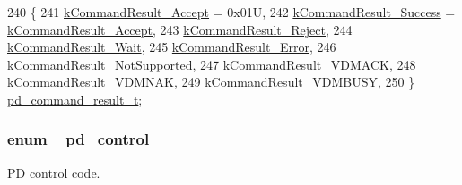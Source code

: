 \begin{DoxyCode}
240 \{
241     \hyperlink{group__usb__pd__stack_ggaa0c9fbfbfb4442ef9d805438bfeb045ca5cbc28129fbc8ef711e9af7a9400d858}{kCommandResult\_Accept} = 0x01U,                  
242     \hyperlink{group__usb__pd__stack_ggaa0c9fbfbfb4442ef9d805438bfeb045ca41691f050dc39a33f802354eacc3df48}{kCommandResult\_Success} = \hyperlink{group__usb__pd__stack_ggaa0c9fbfbfb4442ef9d805438bfeb045ca5cbc28129fbc8ef711e9af7a9400d858}{kCommandResult\_Accept}, 
243     \hyperlink{group__usb__pd__stack_ggaa0c9fbfbfb4442ef9d805438bfeb045ca1f47bf73466bcfd41a0e492b4ee77221}{kCommandResult\_Reject},                          
244     \hyperlink{group__usb__pd__stack_ggaa0c9fbfbfb4442ef9d805438bfeb045cabbcc951c401dbb830050a5ece204079a}{kCommandResult\_Wait},                            
245     \hyperlink{group__usb__pd__stack_ggaa0c9fbfbfb4442ef9d805438bfeb045ca2037b8a85f98d8d2413d589dbe7ea4fd}{kCommandResult\_Error},                           
246     \hyperlink{group__usb__pd__stack_ggaa0c9fbfbfb4442ef9d805438bfeb045caa7d52b6983bc63b06da53587776a1664}{kCommandResult\_NotSupported},                    
247     \hyperlink{group__usb__pd__stack_ggaa0c9fbfbfb4442ef9d805438bfeb045ca8de7fa85a3e37afed0b95cd975959f13}{kCommandResult\_VDMACK},                          
248     \hyperlink{group__usb__pd__stack_ggaa0c9fbfbfb4442ef9d805438bfeb045cac783d71949646db3d0780d123de6bf3c}{kCommandResult\_VDMNAK},                          
249     \hyperlink{group__usb__pd__stack_ggaa0c9fbfbfb4442ef9d805438bfeb045ca7d97a0d078d217c54b88f5a076204572}{kCommandResult\_VDMBUSY},                         
250 \} \hyperlink{group__usb__pd__stack_ga59917b1485caba4dd8d9b65ca5a5fd92}{pd\_command\_result\_t};
\end{DoxyCode}
\hypertarget{group__usb__pd__stack_ga0edd2a390d28d96646bc71aac1858af1}{
\subsubsection[{\-\_\-pd\-\_\-control}]{\setlength{\rightskip}{0pt plus 5cm}enum {\bf \-\_\-pd\-\_\-control}}}\label{group__usb__pd__stack_ga0edd2a390d28d96646bc71aac1858af1}


P\-D control code. 

